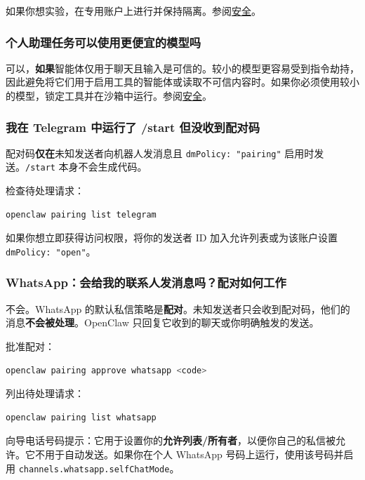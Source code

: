 如果你想实验，在专用账户上进行并保持隔离。参阅\href{/gateway/security}{安全}。

\subsubsection{个人助理任务可以使用更便宜的模型吗}


可以，\textbf{如果}智能体仅用于聊天且输入是可信的。较小的模型更容易受到指令劫持，因此避免将它们用于启用工具的智能体或读取不可信内容时。如果你必须使用较小的模型，锁定工具并在沙箱中运行。参阅\href{/gateway/security}{安全}。

\subsubsection{我在 Telegram 中运行了 /start 但没收到配对码}


配对码\textbf{仅在}未知发送者向机器人发消息且 \texttt{dmPolicy: "pairing"} 启用时发送。\texttt{/start} 本身不会生成代码。

检查待处理请求：

\begin{lstlisting}[language=bash]
openclaw pairing list telegram
\end{lstlisting}


如果你想立即获得访问权限，将你的发送者 ID 加入允许列表或为该账户设置 \texttt{dmPolicy: "open"}。

\subsubsection{WhatsApp：会给我的联系人发消息吗？配对如何工作}


不会。WhatsApp 的默认私信策略是\textbf{配对}。未知发送者只会收到配对码，他们的消息\textbf{不会被处理}。OpenClaw 只回复它收到的聊天或你明确触发的发送。

批准配对：

\begin{lstlisting}[language=bash]
openclaw pairing approve whatsapp <code>
\end{lstlisting}


列出待处理请求：

\begin{lstlisting}[language=bash]
openclaw pairing list whatsapp
\end{lstlisting}


向导电话号码提示：它用于设置你的\textbf{允许列表/所有者}，以便你自己的私信被允许。它不用于自动发送。如果你在个人 WhatsApp 号码上运行，使用该号码并启用 \texttt{channels.whatsapp.selfChatMode}。

